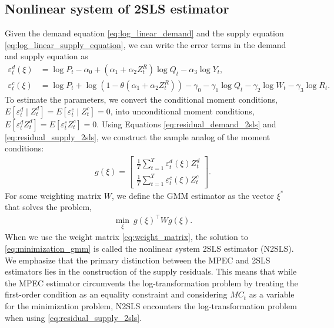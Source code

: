 \documentclass[11pt, a4paper]{article}
\begin{document}
\subsection{Nonlinear system of 2SLS estimator}\label{sec:n2sls}
Given the demand equation \eqref{eq:log_linear_demand} and the supply equation \eqref{eq:log_linear_supply_equation}, we can write the error terms in the demand and supply equation as
\begin{align}
    {\varepsilon}_t^d(\xi) & =  \log P_{t} - \alpha_0 + (\alpha_1 + \alpha_2 Z^{R}_{t}) \log Q_t - \alpha_3 \log Y_t \label{eq:residual_demand_2sls}, \\
    {\varepsilon}_t^c(\xi) & =  \log P_t + \log(1 - \theta(\alpha_1 + \alpha_2 Z^{R}_{t})) -\gamma_0 - \gamma_1 \log Q_t -  \gamma_2 \log W_{t} -\gamma_3 \log R_t \label{eq:residual_supply_2sls}.
\end{align}
To estimate the parameters, we convert the conditional moment conditions, $E[\varepsilon_t^d\mid Z_t^d] = E[\varepsilon_t^c\mid Z_t^c]=0$, into unconditional moment conditions, $E[\varepsilon_t^d Z_t^d] = E[\varepsilon_t^cZ_t^c]=0$.
Using Equations \eqref{eq:residual_demand_2sls} and \eqref{eq:residual_supply_2sls}, we construct the sample analog of the moment conditions:
\begin{align*}
    g(\xi) = \left[\begin{array}{l}
    \frac{1}{T}\sum_{t=1}^T{\varepsilon}^{d}_{t}(\xi)Z_{t}^{d} \\
    \frac{1}{T}\sum_{t=1}^T{\varepsilon}^{c}_{t}(\xi)Z_{t}^{c}
    \end{array}\right].
\end{align*}
For some weighting matrix $W$, we define the GMM estimator as the vector $\xi^*$ that solves the problem,
\begin{align}
    \min_{\xi}\ g(\xi)^\top W g(\xi) \label{eq:minimization_gmm}. 
\end{align}
When we use the weight matrix \eqref{eq:weight_matrix}, the solution to \eqref{eq:minimization_gmm} is called the nonlinear system 2SLS estimator (N2SLS). 
We emphasize that the primary distinction between the MPEC and 2SLS estimators lies in the construction of the supply residuals. This means that while the MPEC estimator circumvents the log-transformation problem by treating the first-order condition as an equality constraint and considering $MC_t$ as a variable for the minimization problem, N2SLS encounters the log-transformation problem when using \eqref{eq:residual_supply_2sls}.
\end{document}

